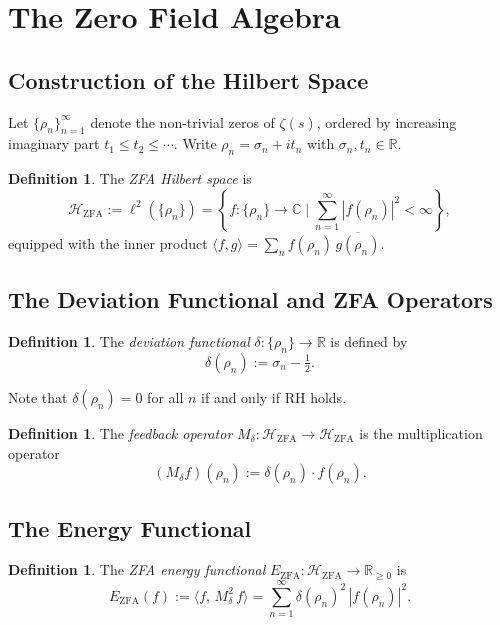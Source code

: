 \documentclass[12pt]{article}
\theoremstyle{definition}
\newtheorem{definition}[theorem]{Definition}
\newcommand{\HZFA}{\mathcal{H}_{\mathrm{ZFA}}}
\newcommand{\EZFA}{E_{\mathrm{ZFA}}}
\newcommand{\Mdelta}{M_{\delta}}
\begin{document}
\section{The Zero Field Algebra}

\subsection{Construction of the Hilbert Space}

Let $\{\rho_n\}_{n=1}^{\infty}$ denote the non-trivial zeros of
$\zeta(s)$, ordered by increasing imaginary part
$t_1 \le t_2 \le \cdots$.
Write $\rho_n = \sigma_n + it_n$ with
$\sigma_n, t_n \in \mathbb{R}$.

\begin{definition}
The \emph{ZFA Hilbert space} is
\[
  \HZFA
  := \ell^2(\{\rho_n\})
  = \left\{
      f : \{\rho_n\} \to \mathbb{C}
      \;\Big|\;
      \sum_{n=1}^{\infty} |f(\rho_n)|^2 < \infty
    \right\},
\]
equipped with the inner product
$\langle f, g\rangle = \sum_{n} f(\rho_n)\,\overline{g(\rho_n)}$.
\end{definition}

\subsection{The Deviation Functional and ZFA Operators}

\begin{definition}
The \emph{deviation functional} $\delta : \{\rho_n\} \to \mathbb{R}$
is defined by
\[
  \delta(\rho_n) := \sigma_n - \tfrac{1}{2}.
\]
\end{definition}

Note that $\delta(\rho_n) = 0$ for all $n$ if and only if RH holds.

\begin{definition}
The \emph{feedback operator} $\Mdelta : \HZFA \to \HZFA$ is the
multiplication operator
\[
  (\Mdelta f)(\rho_n) := \delta(\rho_n)\cdot f(\rho_n).
\]
\end{definition}

\subsection{The Energy Functional}

\begin{definition}
The \emph{ZFA energy functional} $\EZFA : \HZFA \to \mathbb{R}_{\ge 0}$
is
\[
  \EZFA(f)
  := \langle f,\, \Mdelta^2\, f \rangle
  = \sum_{n=1}^{\infty} \delta(\rho_n)^2\,|f(\rho_n)|^2.
\]
\end{definition}
\end{document}
